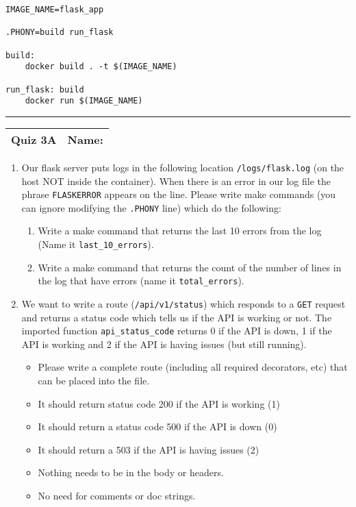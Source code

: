 \documentclass[11pt]{article}
\begin{document}
\begin{verbatim}
IMAGE_NAME=flask_app

.PHONY=build run_flask 

build:
    docker build . -t $(IMAGE_NAME)

run_flask: build
    docker run $(IMAGE_NAME)

\end{verbatim}
{\color{lightgray}\hrule}

\clearpage

\begin{tabularx}{\textwidth}{l|X}
\textbf{Quiz 3A} &   \textbf{Name: } \\
\hline
\end{tabularx}

\vspace{1cm}

\begin{enumerate}
	\item Our flask server puts logs in the following location \texttt{/logs/flask.log} (on the host NOT inside the container). When there is an error in our log file the phrase \texttt{FLASKERROR} appears on the line. Please write make commands (you can ignore modifying the \texttt{.PHONY} line) which do the following:
	\begin{enumerate}
		\item Write a make command that returns the last 10 errors from the log (Name it \texttt{last\_10\_errors}).
		\vspace{3.5cm}
		\item Write a make command that returns the count of the number of lines in the log  that have errors (name it \texttt{total\_errors}). 
	\end{enumerate}
	
	
	\vspace{3.5cm}
	
	 
	\item We want to write a route (\texttt{/api/v1/status}) which responds to a \texttt{GET} request and returns a status code which tells us if the API is working or not. The imported function \texttt{api\_status\_code} returns 0 if the API is down, 1 if the API is working and 2 if the API is having issues (but still running). 
		\begin{itemize}
			\item Please write a complete route (including all required decorators, etc) that can be placed into the file.
			\item It should return status code 200 if the API is working (1)
			\item It should return a status code 500 if the API is down (0)
			\item It should return a 503 if the API is having issues (2)
			\item Nothing needs to be in the body or headers. 
			\item No need for comments or doc strings.
		\end{itemize}
\end{enumerate}
\end{document}

